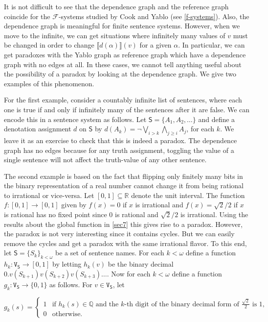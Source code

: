 \documentclass[12pt]{kluwer}
\theoremstyle{remark}
\newcommand{\fancy}[1]{\mathcal{#1}}
\def\S{\textsf{S}}
\def\V{\texttt{V}}
\def\F{\fancy{F}}
\def\F{\fancy{F}}
\begin{document}
It is not difficult to see that the dependence graph and the reference graph coincide for the $\F$-systems studied by Cook and Yablo (see \autoref{f-systems}).  Also, the dependence graph is meaningful for finite sentence systems.  However, when we move to the infinite, we can get situations where infinitely many values of $v$ must be changed in order to change  $\llbracket d(\alpha) \rrbracket(v)$ for a given $\alpha$.  In particular, we can get paradoxes with the Yablo graph as reference graph which have a dependence graph with no edges at all.  In these cases, we cannot tell anything useful about the possibility of a paradox by looking at the dependence graph.  We give two examples of this phenomenon.\newline

For the first example, consider a countably infinite list of sentences, where each one is true if and only if infinitely many of the sentences after it are false. We can encode this in a sentence system as follows.  Let $\S=\{A_1, A_2,\dots\}$ and define a denotation assignment $d$ on $\S$ by $d(A_k)=\neg\bigvee_{i>k}\bigwedge_{j\geq i} A_j$, for each $k$. We leave it as an exercise to check that this is indeed a paradox. The dependence graph has no edges because for any truth assignment, toggling the value of a single sentence will not affect the truth-value of any other sentence.\newline

The second example is based on the fact that flipping only finitely many bits in the binary representation of a real number cannot change it from being rational to irrational or vice-versa. Let $[0,1] \subseteq \mathbb{R}$ denote the unit interval. The function $f:[0,1] \rightarrow [0,1]$ given by $f(x) = 0$ if $x$ is irrational and $f(x) = \sqrt{2}/2$ if $x$ is rational has no fixed point since $0$ is rational and $\sqrt{2}/2$ is irrational.  Using the results about the global function in \autoref{sec7} this gives rise to a paradox.  However, the paradox is not very interesting since it contains cycles.  But we can easily remove the cycles and get a paradox with the same irrational flavor. To this end, let $\S = \{S_k\}_{k < \omega}$ be a set of sentence names.   For each $k < \omega$ define a function $h_k:\V_\S \rightarrow [0,1]$ by letting $h_k(v)$ be the binary decimal $0.v(S_{k+1})v(S_{k+2})v(S_{k+3})\ldots$.  Now for each $k < \omega$ define a function $g_k:\V_\S \rightarrow \{0, 1\}$ as follows. For $v \in \V_\S$, let 

\[g_k(s) = \begin{cases}
1 & \text{if } h_k(s) \in \mathbb{Q} \text{ and the $k$-th digit of the binary decimal form of $\frac{\sqrt{2}}{2}$ is $1$,}\\
0 & \text{otherwise}.
\end{cases}\]
\end{document}
